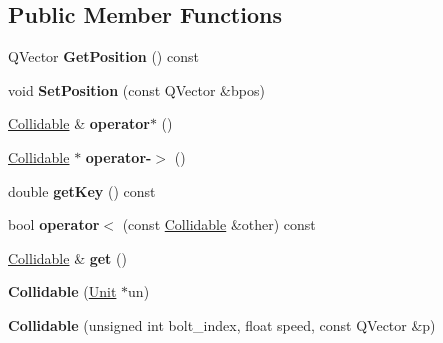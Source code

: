 \subsection*{Public Member Functions}
\begin{DoxyCompactItemize}
\item 
Q\+Vector {\bfseries Get\+Position} () const \hypertarget{classCollidable_a382e7e9d882fefe81621fcb2ef92850a}{}\label{classCollidable_a382e7e9d882fefe81621fcb2ef92850a}

\item 
void {\bfseries Set\+Position} (const Q\+Vector \&bpos)\hypertarget{classCollidable_a9df1e27a9f2161880a01aac07dd221d2}{}\label{classCollidable_a9df1e27a9f2161880a01aac07dd221d2}

\item 
\hyperlink{classCollidable}{Collidable} \& {\bfseries operator$\ast$} ()\hypertarget{classCollidable_afb62030fedd2efc1c62be9f24349d7cc}{}\label{classCollidable_afb62030fedd2efc1c62be9f24349d7cc}

\item 
\hyperlink{classCollidable}{Collidable} $\ast$ {\bfseries operator-\/$>$} ()\hypertarget{classCollidable_aca1be35c664d61819b6347ea89b6cd81}{}\label{classCollidable_aca1be35c664d61819b6347ea89b6cd81}

\item 
double {\bfseries get\+Key} () const \hypertarget{classCollidable_a3fdef889d55f3f648d192ec6c7cbea21}{}\label{classCollidable_a3fdef889d55f3f648d192ec6c7cbea21}

\item 
bool {\bfseries operator$<$} (const \hyperlink{classCollidable}{Collidable} \&other) const \hypertarget{classCollidable_a90bb5a0970ee0455fa4605ac982aac58}{}\label{classCollidable_a90bb5a0970ee0455fa4605ac982aac58}

\item 
\hyperlink{classCollidable}{Collidable} \& {\bfseries get} ()\hypertarget{classCollidable_ace2f417695ac9a8901ae79aa0c7c1366}{}\label{classCollidable_ace2f417695ac9a8901ae79aa0c7c1366}

\item 
{\bfseries Collidable} (\hyperlink{classUnit}{Unit} $\ast$un)\hypertarget{classCollidable_ae3b8d27666607bcfa177bb97502d8aec}{}\label{classCollidable_ae3b8d27666607bcfa177bb97502d8aec}

\item 
{\bfseries Collidable} (unsigned int bolt\+\_\+index, float speed, const Q\+Vector \&p)\hypertarget{classCollidable_a345638e87fb772b99320fbab396081ea}{}\label{classCollidable_a345638e87fb772b99320fbab396081ea}

\end{DoxyCompactItemize}
